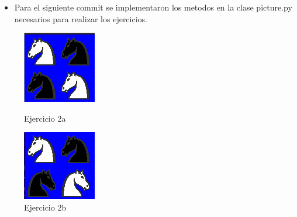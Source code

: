 \documentclass{article}
\begin{document}
	\begin{itemize}	
		\item Para el siguiente commit se implementaron los metodos en la clase picture.py necesarios para realizar los ejercicios.
	\end{itemize}	

    \begin{figure}[htbp]
        \begin{minipage}{0.5\textwidth}
            \centering
            \includegraphics[width=0.5\linewidth]{img/ejercicio_02_a.png}
            \caption{Ejercicio 2a}
            \label{fig:1l}
        \end{minipage}%
        \begin{minipage}{0.5\textwidth}
            \centering
            \includegraphics[width=0.5\linewidth]{img/ejercicio_02_b.png}
            \caption{Ejercicio 2b}
            \label{fig:2}
        \end{minipage}
    \end{figure}
\end{document}
